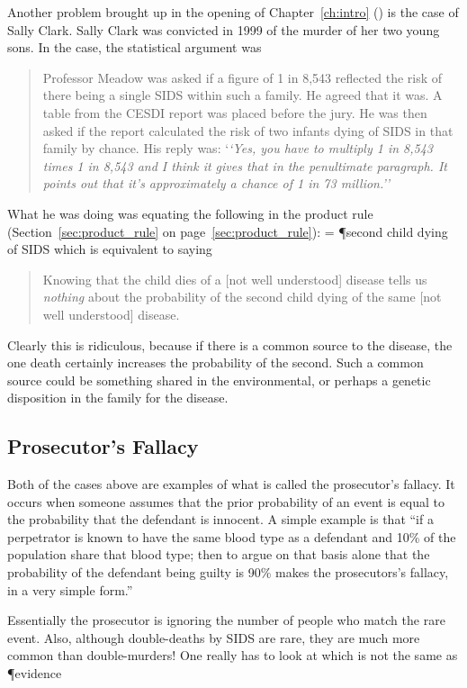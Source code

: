 Another problem brought up in the opening of Chapter~\ref{ch:intro} () is the case of Sally Clark.  Sally Clark was convicted in 1999 of the murder of her two young sons\cite{KAY:2003uq}.  In the case, the statistical argument was
\begin{quote}
Professor Meadow was asked if a figure of 1 in 8,543 reflected the risk of there being a single SIDS within such a family. He agreed that it was. A table from the CESDI report was placed before the jury. He was then asked if the report calculated the risk of two infants dying of SIDS in that family by chance. His reply was:
`\emph{`Yes, you have to multiply 1 in 8,543 times 1 in 8,543 and I think it gives that in the penultimate paragraph. It points out that it's approximately a chance of 1 in 73 million.''
}\end{quote}

What he was doing was equating the following in the product rule (Section~\ref{sec:product_rule} on page~\ref{sec:product_rule}):
\beqn
{} = \P{second child dying of SIDS}
\eeqn
which is equivalent to saying
\begin{quote}
Knowing that the child dies of a [not well understood] disease tells us \emph{nothing} about the probability of the second child dying of the same [not well understood] disease.
\end{quote}
Clearly this is ridiculous, because if there is a common source to the disease, the one death certainly increases the probability of the second.  Such a common source could be something shared in the environmental, or perhaps a genetic disposition in the family for the disease.


\subsection{Prosecutor's Fallacy}

Both of the cases above are examples of what is called the prosecutor's fallacy.  It occurs when someone assumes that the prior probability of an event is equal to the probability that the defendant is innocent.  A simple example is that ``if a perpetrator is known to have the same blood type as a defendant and 10\% of the population share that blood type; then to argue on that basis alone that the probability of the defendant being guilty is 90\% makes the prosecutors's fallacy, in a very simple form.''\cite{Wikipedia:2014fk}

Essentially the prosecutor is ignoring the number of people who match the rare event.  Also, although double-deaths by SIDS are rare, they are much more common than double-murders!  One really has to look at 
\beqn
{}
\eeqn
which is not the same as
\beqn
\P{evidence}
\eeqn





